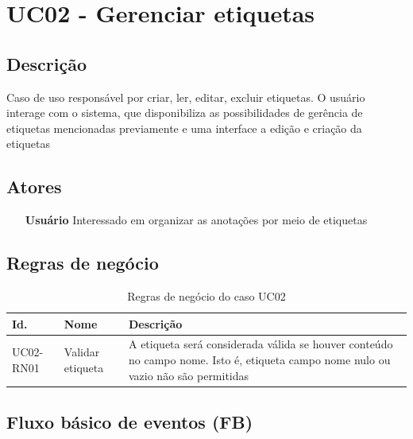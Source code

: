 \documentclass[
	12pt,				%
	oneside,			%
	a4paper,			%
	english,			%
	brazil,				%
	]{abntex2}
\begin{document}
%
%
\chapter{UC02 - Gerenciar etiquetas}
\section{Descrição} 
Caso de uso responsável por criar, ler, editar, excluir etiquetas. O usuário interage com o sistema, que disponibiliza as possibilidades de gerência de etiquetas mencionadas previamente e uma interface a edição e criação da etiquetas 
\section{Atores}
\begin{itemize}
    \item[\textbf{Usuário}] Interessado em organizar as anotações por meio de etiquetas
\end{itemize}

\section{Regras de negócio}
\IBGEtabfontsize
\begin{longtable}{@{}lp{}p{}@{}}
\caption{Regras de negócio do caso UC02}
\label{tab:uc02:regras_de_negocio} \\
\toprule
\textbf{Id.} & \textbf{Nome} & \textbf{Descrição} \\ \midrule
\label{uc02:rn01_validar} UC02-RN01 & Validar etiqueta & A etiqueta será considerada válida se houver conteúdo no campo nome. Isto é, etiqueta campo nome nulo ou vazio não  são permitidas \\ \bottomrule

\end{longtable}

\section{Fluxo básico de eventos (FB)}
\end{document}
